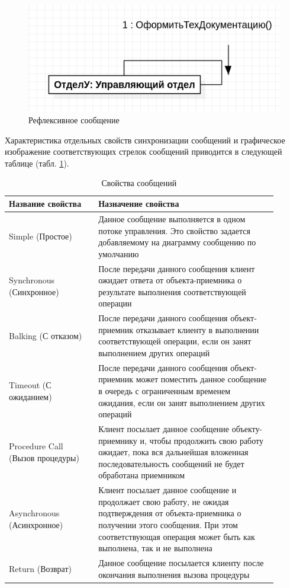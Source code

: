 \documentclass[a4paper,12pt]{report}
\begin{document}
\begin{figure}[h!]
	\centering
	\includegraphics[width=0.7\linewidth]{images/message3}
	\caption{Рефлексивное сообщение}
	\label{fig:message3}
\end{figure}

Характеристика отдельных свойств синхронизации сообщений и графическое изображение соответствующих стрелок сообщений приводится в следующей таблице (табл. \ref{tab:messages}).

\begin{table}[h!]

	\begin{tabular}{|m{0.3\linewidth}|m{0.6\linewidth}|}
		\hline
	\textbf{Название свойства} & \textbf{Назначение свойства} \\ \hline
		Simple 
		(Простое) & Данное сообщение выполняется в одном потоке управления. Это свойство задается добавляемому на диаграмму сообщению по умолчанию \\ \hline
		Synchronous 
		(Синхронное) & После передачи данного сообщения клиент ожидает ответа от объекта-приемника о результате выполнения соответствующей операции \\ \hline
		Balking 
		(С отказом) & После передачи данного сообщения объект-приемник отказывает клиенту в выполнении соответствующей операции, если он занят выполнением других операций \\ \hline
		Timeout 
		(С ожиданием) & После передачи данного сообщения объект-приемник может поместить данное сообщение в очередь с ограниченным временем ожидания, если он занят выполнением других операций \\ \hline
		Procedure Call
		(Вызов процедуры) & Клиент посылает данное сообщение объекту-приемнику и, чтобы продолжить свою работу ожидает, пока вся дальнейшая вложенная последовательность сообщений не будет обработана приемником \\ \hline
		Asynchronous
		(Асинхронное) & Клиент посылает данное сообщение и продолжает свою работу, не ожидая подтверждения от объекта-приемника о получении этого сообщения. При этом соответствующая операция может быть как выполнена, так и не выполнена \\ \hline
		Return (Возврат) & Данное сообщение посылается клиенту после окончания выполнения вызова процедуры \\ \hline
	\end{tabular}
	\caption{Свойства сообщений}
	\label{tab:messages}
\end{table}
\newpage
\end{document}
